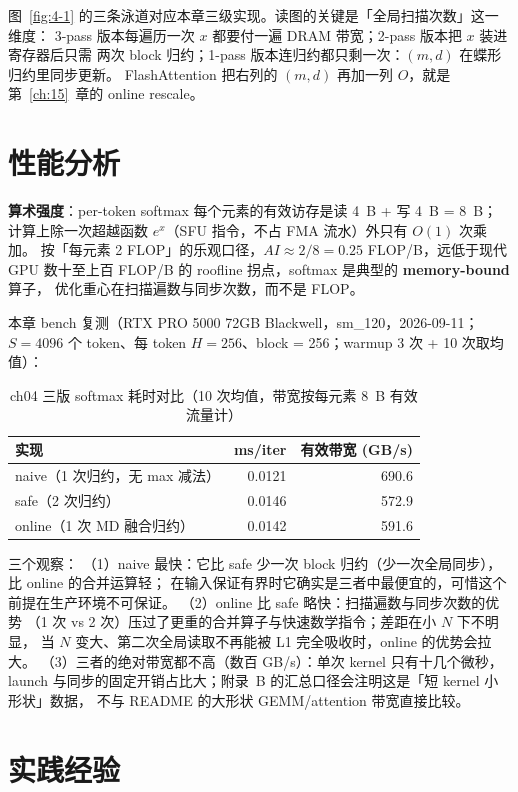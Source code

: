 图~\ref{fig:4-1} 的三条泳道对应本章三级实现。读图的关键是「全局扫描次数」这一维度：
3-pass 版本每遍历一次 $x$ 都要付一遍 DRAM 带宽；2-pass 版本把 $x$ 装进寄存器后只需
两次 block 归约；1-pass 版本连归约都只剩一次：$(m, d)$ 在蝶形归约里同步更新。
FlashAttention 把右列的 $(m,d)$ 再加一列 $O$，就是第~\ref{ch:15}~章的 online rescale。

\section{性能分析}

\textbf{算术强度}：per-token softmax 每个元素的有效访存是读 4~B + 写 4~B = 8~B；
计算上除一次超越函数 $e^{x}$（SFU 指令，不占 FMA 流水）外只有 $O(1)$ 次乘加。
按「每元素 2 FLOP」的乐观口径，$AI \approx 2/8 = 0.25$ FLOP/B，远低于现代 GPU
数十至上百 FLOP/B 的 roofline 拐点，softmax 是典型的 \textbf{memory-bound} 算子，
优化重心在扫描遍数与同步次数，而不是 FLOP。

本章 bench 复测（RTX PRO 5000 72GB Blackwell，sm\_120，2026-09-11；
$S = 4096$ 个 token、每 token $H = 256$、block = 256；warmup 3 次 + 10 次取均值）：

\begin{table}[htbp]
\centering
\caption{ch04 三版 softmax 耗时对比（10 次均值，带宽按每元素 8~B 有效流量计）}
\label{tab:4-bench}
\begin{tabular}{lrr}
\toprule
实现 & ms/iter & 有效带宽 (GB/s) \\
\midrule
naive（1 次归约，无 max 减法） & 0.0121 & 690.6 \\
safe（2 次归约）              & 0.0146 & 572.9 \\
online（1 次 MD 融合归约）     & 0.0142 & 591.6 \\
\bottomrule
\end{tabular}
\end{table}

三个观察：
（1）naive 最快：它比 safe 少一次 block 归约（少一次全局同步），比 online 的合并运算轻；
在输入保证有界时它确实是三者中最便宜的，可惜这个前提在生产环境不可保证。
（2）online 比 safe 略快：扫描遍数与同步次数的优势
（1 次 vs 2 次）压过了更重的合并算子与快速数学指令；差距在小 $N$ 下不明显，
当 $N$ 变大、第二次全局读取不再能被 L1 完全吸收时，online 的优势会拉大。
（3）三者的绝对带宽都不高（数百 GB/s）：单次 kernel 只有十几个微秒，
launch 与同步的固定开销占比大；附录~B 的汇总口径会注明这是「短 kernel 小形状」数据，
不与 README 的大形状 GEMM/attention 带宽直接比较。

\section{实践经验}


